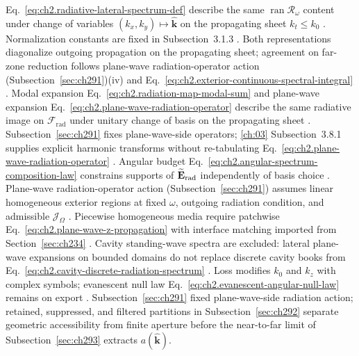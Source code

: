 Eq.~\eqref{eq:ch2.radiative-lateral-spectrum-def} describe the same
\(\operatorname{ran}\mathcal{R}_\omega\) content under change of variables
\((k_x,k_y)\mapsto\widehat{\mathbf{k}}\) on the propagating sheet \(k_t\le k_0\)
\cite{stratton1941}. Normalization constants are fixed in
Subsection~3.1.3 \cite{stratton1941}. Both representations diagonalize outgoing propagation on the propagating sheet; agreement on
far-zone reduction follows plane-wave radiation-operator action (Subsection~\ref{sec:ch291})(iv) and
Eq.~\eqref{eq:ch2.exterior-continuous-spectral-integral} \cite{stratton1941}.
Modal expansion Eq.~\eqref{eq:ch2.radiation-map-modal-sum} and plane-wave expansion
Eq.~\eqref{eq:ch2.plane-wave-radiation-operator} describe the same radiative image on
\(\mathcal{F}_{\mathrm{rad}}\) under unitary change of basis on the propagating sheet
\cite{stratton1941}. Subsection~\ref{sec:ch291} fixes plane-wave-side operators;
\ref{ch:03} Subsection~3.8.1 supplies explicit harmonic transforms without
re-tabulating Eq.~\eqref{eq:ch2.plane-wave-radiation-operator} \cite{stratton1941}. Angular
budget Eq.~\eqref{eq:ch2.angular-spectrum-composition-law} constrains supports of
\(\widetilde{\mathbf{E}}_{\mathrm{rad}}\) independently of basis choice \cite{harrington2001}. Plane-wave radiation-operator action (Subsection~\ref{sec:ch291}) assumes linear homogeneous exterior
regions at fixed \(\omega\), outgoing radiation condition, and admissible \(\mathcal{J}_\Omega\)
\cite{stratton1941}. Piecewise homogeneous media require patchwise
Eq.~\eqref{eq:ch2.plane-wave-z-propagation} with interface matching imported from
Section~\ref{sec:ch234} \cite{stratton1941}. Cavity standing-wave spectra are excluded: lateral
plane-wave expansions on bounded domains do not replace discrete cavity books from
Eq.~\eqref{eq:ch2.cavity-discrete-radiation-spectrum} \cite{jackson1999}. Loss
modifies \(k_0\) and \(k_z\) with complex symbols; evanescent null law
Eq.~\eqref{eq:ch2.evanescent-angular-null-law} remains on export \cite{stratton1941}.
Subsection~\ref{sec:ch291} fixed plane-wave-side radiation action; retained, suppressed, and
filtered partitions in Subsection~\ref{sec:ch292} separate geometric accessibility from finite
aperture before the near-to-far limit of Subsection~\ref{sec:ch293} extracts $a(\widehat{\mathbf{k}})$.
